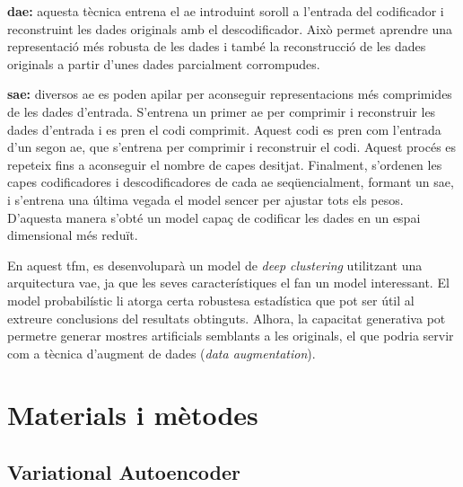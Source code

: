 \documentclass[CAT,BIB]{TFUOC}%
\begin{document}
        \textbf{\Gls{dae}:} aquesta tècnica entrena el \gls{ae} introduint soroll a l'entrada del codificador i reconstruint les dades originals amb el descodificador. Això permet aprendre una representació més robusta de les dades i també la reconstrucció de les dades originals a partir d'unes dades parcialment corrompudes.

        \textbf{\Gls{sae}:} diversos \gls{ae} es poden apilar per aconseguir representacions més comprimides de les dades d'entrada. S'entrena un primer \gls{ae} per comprimir i reconstruir les dades d'entrada i es pren el codi comprimit. Aquest codi es pren com l'entrada d'un segon \gls{ae}, que s'entrena per comprimir i reconstruir el codi. Aquest procés es repeteix fins a aconseguir el nombre de capes desitjat. Finalment, s'ordenen les capes codificadores i descodificadores de cada \gls{ae} seqüencialment, formant un \gls{sae}, i s'entrena una última vegada el model sencer per ajustar tots els pesos. D'aquesta manera s'obté un model capaç de codificar les dades en un espai dimensional més reduït.

        En aquest \gls{tfm}, es desenvoluparà un model de \textit{deep clustering} utilitzant una arquitectura \gls{vae}, ja que les seves característiques el fan un model interessant. El model probabilístic li atorga certa robustesa estadística que pot ser útil al extreure conclusions del resultats obtinguts. Alhora, la capacitat generativa pot permetre generar mostres artificials semblants a les originals, el que podria servir com a tècnica d'augment de dades (\textit{data augmentation}).


\chapter{Materials i mètodes}

    \section{Variational Autoencoder}
    \label{s:vae}
\end{document}
